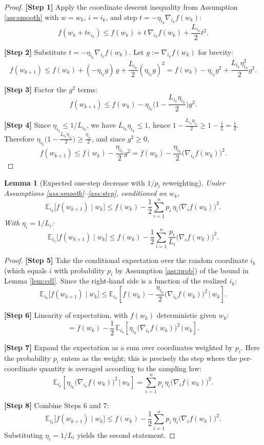 \documentclass{article}
\newtheorem{lemma}{Lemma}
\begin{document}
\begin{proof}
\textbf{[Step 1]} Apply the coordinate descent inequality from Assumption
\ref{ass:smooth} with $w = w_k$, $i = i_k$, and step
$t = -\eta_{i_k}\nabla_{i_k} f(w_k)$:
\[
f(w_k + t e_{i_k}) \le f(w_k) + t\,\nabla_{i_k} f(w_k) + \frac{L_{i_k}}{2} t^2 .
\]

\textbf{[Step 2]} Substitute $t = -\eta_{i_k}\nabla_{i_k} f(w_k)$. Let
$g := \nabla_{i_k} f(w_k)$ for brevity:
\[
f(w_{k+1}) \le f(w_k) + (-\eta_{i_k} g)\, g + \frac{L_{i_k}}{2}(\eta_{i_k} g)^2
= f(w_k) - \eta_{i_k} g^2 + \frac{L_{i_k}\eta_{i_k}^2}{2} g^2 .
\]

\textbf{[Step 3]} Factor the $g^2$ terms:
\[
f(w_{k+1}) \le f(w_k) - \eta_{i_k}\Big(1 - \frac{L_{i_k}\eta_{i_k}}{2}\Big) g^2 .
\]

\textbf{[Step 4]} Since $\eta_{i_k} \le 1/L_{i_k}$, we have
$L_{i_k}\eta_{i_k} \le 1$, hence
$1 - \frac{L_{i_k}\eta_{i_k}}{2} \ge 1 - \frac12 = \frac12$. Therefore
$\eta_{i_k}\big(1 - \frac{L_{i_k}\eta_{i_k}}{2}\big) \ge \frac{\eta_{i_k}}{2}$,
and since $g^2 \ge 0$,
\[
f(w_{k+1}) \le f(w_k) - \frac{\eta_{i_k}}{2} g^2
= f(w_k) - \frac{\eta_{i_k}}{2}\big(\nabla_{i_k} f(w_k)\big)^2 .
\]
\end{proof}

\begin{lemma}[Expected one-step decrease with $1/p_i$ reweighting]
\label{lem:descent}
Under Assumptions \ref{ass:smooth}--\ref{ass:step}, conditioned on $w_k$,
\[
\mathbb{E}_{i_k}\big[ f(w_{k+1}) \mid w_k \big]
\le f(w_k) - \frac12 \sum_{i=1}^n p_i\, \eta_i \big(\nabla_i f(w_k)\big)^2 .
\]
With $\eta_i = 1/L_i$:
\[
\mathbb{E}_{i_k}\big[ f(w_{k+1}) \mid w_k \big]
\le f(w_k) - \frac12 \sum_{i=1}^n \frac{p_i}{L_i}\big(\nabla_i f(w_k)\big)^2 .
\]
\end{lemma}

\begin{proof}
\textbf{[Step 5]} Take the conditional expectation over the random coordinate $i_k$
(which equals $i$ with probability $p_i$ by Assumption \ref{ass:prob}) of the bound
in Lemma \ref{lem:cdl}. Since the right-hand side is a function of the realized
$i_k$:
\[
\mathbb{E}_{i_k}\big[ f(w_{k+1}) \mid w_k \big]
\le \mathbb{E}_{i_k}\!\left[ f(w_k) - \frac{\eta_{i_k}}{2}\big(\nabla_{i_k} f(w_k)\big)^2
\,\Big|\, w_k \right].
\]

\textbf{[Step 6]} Linearity of expectation, with $f(w_k)$ deterministic given $w_k$:
\[
= f(w_k) - \frac12\, \mathbb{E}_{i_k}\!\left[
\eta_{i_k}\big(\nabla_{i_k} f(w_k)\big)^2 \,\Big|\, w_k \right].
\]

\textbf{[Step 7]} Expand the expectation as a sum over coordinates weighted by $p_i$.
Here the probability $p_i$ enters as the weight; this is precisely the step where
the per-coordinate quantity is averaged according to the sampling law:
\[
\mathbb{E}_{i_k}\!\left[ \eta_{i_k}\big(\nabla_{i_k} f(w_k)\big)^2 \,\Big|\, w_k \right]
= \sum_{i=1}^n p_i\, \eta_i \big(\nabla_i f(w_k)\big)^2 .
\]

\textbf{[Step 8]} Combine Steps 6 and 7:
\[
\mathbb{E}_{i_k}\big[ f(w_{k+1}) \mid w_k \big]
\le f(w_k) - \frac12 \sum_{i=1}^n p_i\, \eta_i \big(\nabla_i f(w_k)\big)^2 .
\]
Substituting $\eta_i = 1/L_i$ yields the second statement.
\end{proof}
\end{document}

